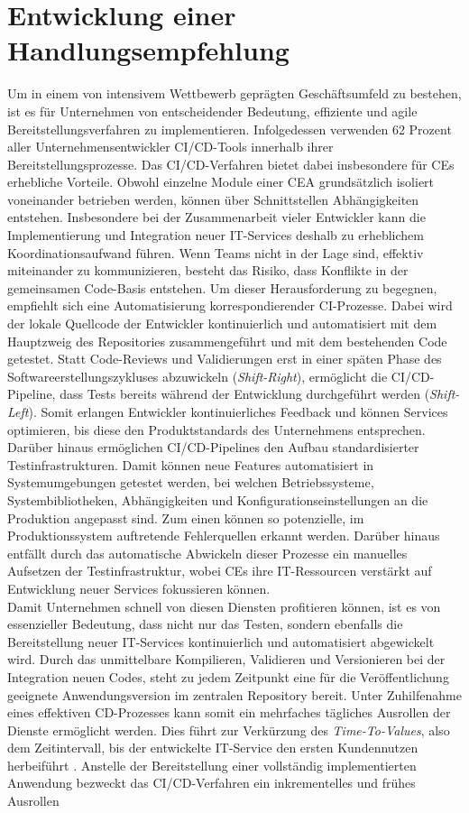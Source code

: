 
\section{Entwicklung einer Handlungsempfehlung}
\label{sec:Handlungsempfehlung}
Um in einem von intensivem Wettbewerb geprägten Geschäftsumfeld zu bestehen, ist es für Unternehmen von entscheidender Bedeutung, effiziente und agile Bereitstellungsverfahren zu implementieren. Infolgedessen verwenden 62 Prozent aller Unternehmensentwickler CI/CD-Tools innerhalb ihrer Bereitstellungsprozesse. Das CI/CD-Verfahren bietet dabei insbesondere für CEs erhebliche Vorteile. Obwohl einzelne Module einer CEA grundsätzlich isoliert voneinander betrieben werden, können über Schnittstellen Abhängigkeiten entstehen. Insbesondere bei der Zusammenarbeit vieler Entwickler kann die Implementierung und Integration neuer IT-Services deshalb zu erheblichem Koordinationsaufwand führen. Wenn Teams nicht in der Lage sind, effektiv miteinander zu kommunizieren, besteht das Risiko, dass Konflikte in der gemeinsamen Code-Basis entstehen. Um dieser Herausforderung zu begegnen, empfiehlt sich eine Automatisierung korrespondierender CI-Prozesse. Dabei wird der lokale Quellcode der Entwickler kontinuierlich und automatisiert mit dem Hauptzweig des Repositories zusammengeführt und mit dem bestehenden Code getestet. Statt Code-Reviews und Validierungen erst in einer späten Phase des Softwareerstellungszykluses abzuwickeln (\textit{Shift-Right}), ermöglicht die CI/CD-Pipeline, dass Tests bereits während der Entwicklung durchgeführt werden (\textit{Shift-Left}). Somit erlangen Entwickler kontinuierliches Feedback und können Services optimieren, bis diese den Produktstandards des Unternehmens entsprechen. Darüber hinaus ermöglichen CI/CD-Pipelines den Aufbau standardisierter Testinfrastrukturen. Damit können neue Features automatisiert in Systemumgebungen getestet werden, bei welchen Betriebssysteme, Systembibliotheken, Abhängigkeiten und Konfigurationseinstellungen an die Produktion angepasst sind. Zum einen können so potenzielle, im Produktionssystem auftretende Fehlerquellen erkannt werden. Darüber hinaus entfällt durch das automatische Abwickeln dieser Prozesse ein manuelles Aufsetzen der Testinfrastruktur, wobei CEs ihre IT-Ressourcen verstärkt auf Entwicklung neuer Services fokussieren können.\\ Damit Unternehmen schnell von diesen Diensten profitieren können, ist es von essenzieller Bedeutung, dass nicht nur das Testen, sondern ebenfalls die Bereitstellung neuer IT-Services kontinuierlich und automatisiert abgewickelt wird. Durch das unmittelbare Kompilieren, Validieren und Versionieren bei der Integration neuen Codes, steht zu jedem Zeitpunkt eine für die Veröffentlichung geeignete Anwendungsversion im zentralen Repository bereit. Unter Zuhilfenahme eines effektiven CD-Prozesses kann somit ein mehrfaches tägliches Ausrollen der Dienste ermöglicht werden. Dies führt zur Verkürzung des \textit{Time-To-Values}, also dem Zeitintervall, bis der entwickelte IT-Service den ersten Kundennutzen herbeiführt \cite{Prof.Dr.RalfT.Kreutzer.20180215}. Anstelle der Bereitstellung einer vollständig implementierten Anwendung bezweckt das CI/CD-Verfahren ein inkrementelles und frühes Ausrollen 